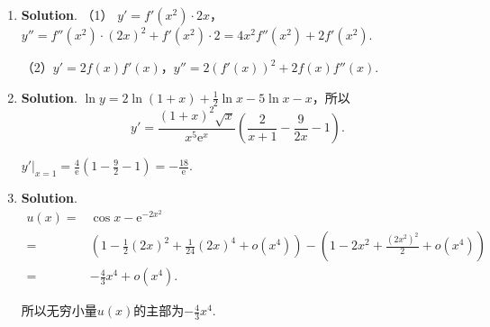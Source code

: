 \documentclass[../Main.tex]{subfiles}
\begin{document}
\begin{enumerate}
          所以$\left.\frac{\mathrm{d}^{2} x}{\mathrm{d}y^{2}}\right|_{y=\frac{\pi}{4}}
              =\frac{2}{3}\cdot\frac{4\cdot 3-2\cdot 3}{3^{2}}=\frac{4}{9}$.

    \item \textbf{Solution}. （1） $y'=f'(x^{2})\cdot 2x$，$y''=f''(x^{2})\cdot (
              2x)^{2}+f'(x^{2})\cdot 2 = 4x^{2} f''(x^{2})+2f'(x^{2})$.

          （2）$y'=2f(x)f'(x)$，$y''=2(f'(x))^{2}+2f(x)f''(x)$.

    \item \textbf{Solution}. $\ln y = 2\ln(1+x)+\frac{1}{2}\ln x-5\ln x-x$，所以
          \[
              y' = \frac{(1+x)^{2}\sqrt{x}}{x^{5}\mathrm{e}^{x}}\left(\frac{2}{x+1}-\frac{9}{2x}
              -1\right).
          \]

          $\left.y'\right|_{x=1}=\frac{4}{\mathrm{e}}\left(1-\frac{9}{2}-1\right)=-\frac{18}{\mathrm{e}}$.

    \item \textbf{Solution}.
          \[
              \begin{aligned}
                  u(x) = & \cos x-\mathrm{e}^{-2x^2}                                                                                          \\
                  =      & \left(1-\frac{1}{2}(2x)^{2}+\frac{1}{24}(2x)^{4}+o(x^{4})\right)-\left(1-2x^{2}+\frac{(2x^2)^2}{2}+o(x^{4})\right) \\
                  =      & -\frac{4}{3}x^{4}+o(x^{4}).
              \end{aligned}
          \]

          所以无穷小量$u(x)$的主部为$-\frac{4}{3}x^{4}$.
\end{enumerate}
\end{document}
